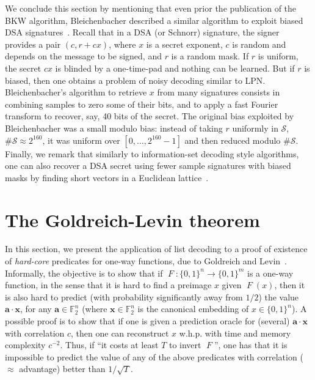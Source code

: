 \documentclass[11pt,a4paper]{article}
\theoremstyle{definition}
\DeclareMathOperator\fun{\mathit{F}}
\newcommand\ftwo{\mathbb{F}_{2}}
\newcommand\zo{\{0,1\}}
\begin{document}
\medskip

We conclude this section by mentioning that even prior the publication of the BKW algorithm, Bleichenbacher described a similar algorithm to exploit biased DSA signatures~\cite{bleichenbacher, ac14bleich}.
Recall that in a DSA (or Schnorr) signature, the signer provides a pair $(c,r+cx)$, where $x$ is a secret exponent, $c$ is random and depends on the message to be signed, and $r$ is
a random mask. If $r$ is uniform, the secret $cx$ is blinded by a one-time-pad and nothing can be learned. But if $r$ is biased, then one obtains a problem of noisy decoding similar
to LPN. Bleichenbacher's algorithm to retrieve $x$ from many signatures consists in combining samples to zero some of their bits, and to apply a fast Fourier transform to recover,
say, 40 bits of the secret. The original bias exploited by Bleichenbacher was a small modulo bias: instead of taking $r$ uniformly in $\mathcal{S}$, $\#\mathcal{S} \approx 2^{160}$,
it was uniform over $[0,\ldots,2^{160}-1]$ and then reduced modulo $\#\mathcal{S}$.
Finally, we remark that similarly to information-set decoding style algorithms, one can also recover a DSA secret using fewer sample signatures with biased masks by finding short vectors in
a Euclidean lattice~\cite{howgrave_grahm_Smart_dsa}.

\section{The Goldreich-Levin theorem}

In this section, we present the application of list decoding to a proof of existence of \emph{hard-core} predicates for one-way functions, due to Goldreich and Levin~\cite{gl}. Informally,
the objective is to show that if $\fun : \zo^n \rightarrow \zo^m$ is a one-way function, in the sense that it is hard to find a preimage $x$ given $\fun(x)$, then it is also hard to predict
(with probability significantly away from $1/2$)
the value $\bm{a}\cdot\bm{x}$, for any $\bm{a} \in \ftwo^n$ (where $\bm{x} \in \ftwo^n$ is the canonical embedding of $x \in \zo^n$). A possible proof is to show that if one is given
a prediction oracle for (several) $\bm{a}\cdot\bm{x}$ with correlation $c$, then one can reconstruct $x$ w.h.p. with time and memory complexity $c^{-2}$. Thus, if ``it costs at least $T$
to invert $\fun$'', one has that it is impossible to predict the value of any of the above predicates with correlation ($\approx$ advantage) better than $1/\sqrt{T}$.
\end{document}

